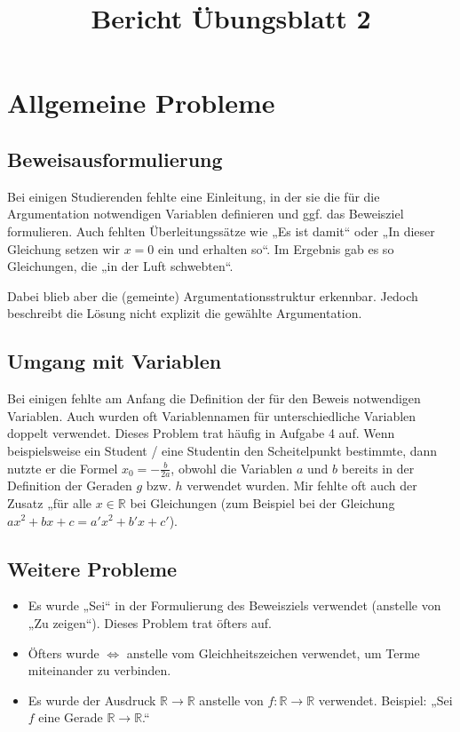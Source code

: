 \documentclass[a4paper]{article}
\title{Bericht Übungsblatt 2}
\date{}
\newcommand*{\R}{\mathbb R}
\begin{document}
\maketitle

\section{Allgemeine Probleme}

\subsection{Beweisausformulierung}

Bei einigen Studierenden fehlte eine Einleitung, in der sie die für die Argumentation notwendigen Variablen definieren und ggf. das Beweisziel formulieren. Auch fehlten Überleitungssätze wie „Es ist damit\textellipsis“ oder „In dieser Gleichung setzen wir $x=0$ ein und erhalten so\textellipsis“. Im Ergebnis gab es so Gleichungen, die „in der Luft schwebten“.

Dabei blieb aber die (gemeinte) Argumentationsstruktur erkennbar. Jedoch beschreibt die Lösung nicht explizit die gewählte Argumentation.

\subsection{Umgang mit Variablen}

Bei einigen fehlte am Anfang die Definition der für den Beweis notwendigen Variablen. Auch wurden oft Variablennamen für unterschiedliche Variablen doppelt verwendet. Dieses Problem trat häufig in Aufgabe 4 auf. Wenn beispielsweise ein Student / eine Studentin den Scheitelpunkt bestimmte, dann nutzte er die Formel $x_0=-\frac{b}{2a}$, obwohl die Variablen $a$ und $b$ bereits in der Definition der Geraden $g$ bzw. $h$ verwendet wurden. Mir fehlte oft auch der Zusatz „für alle $x\in\R$ bei Gleichungen (zum Beispiel bei der Gleichung $ax^2+bx+c=a'x^2+b'x+c'$).

\subsection{Weitere Probleme}

\begin{itemize}
  \item Es wurde „Sei“ in der Formulierung des Beweisziels verwendet (anstelle von „Zu zeigen“). Dieses Problem trat öfters auf.
  \item Öfters wurde $\iff$ anstelle vom Gleichheitszeichen verwendet, um Terme miteinander zu verbinden.
  \item Es wurde der Ausdruck $\R\to\R$ anstelle von $f:\R\to\R$ verwendet. Beispiel: „Sei $f$ eine Gerade $\R\to\R$.“
\end{itemize}
\end{document}
